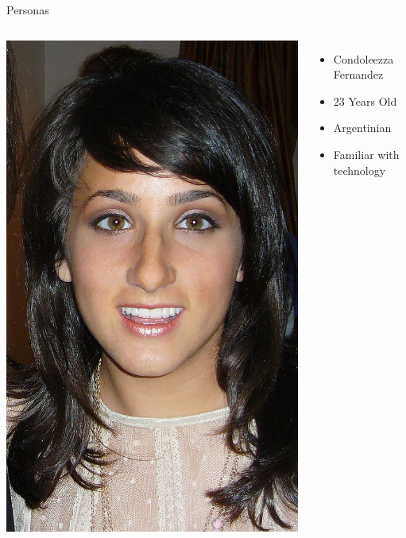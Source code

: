 \documentclass{beamer}
\begin{document}
\begin{frame}{Personas}
\begin{columns}[c]
        \center\includegraphics[height=0.5 \textheight]{bios/girl.jpg}
        \begin{itemize}
            \item Condoleezza Fernandez
            \item 23 Years Old
            \item Argentinian
            \item Familiar with technology
        \end{itemize}
    \end{columns}
\end{frame}
\end{document}
